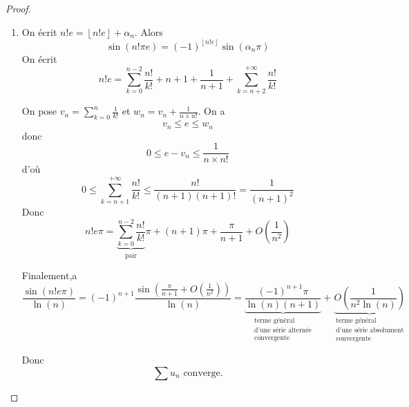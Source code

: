 \documentclass[12pt]{article}
\begin{document}
\begin{proof}
\begin{enumerate}
		\item On écrit $n!e=\left\lfloor n!e\right\rfloor+\alpha_{n}$.
		Alors 
		\begin{equation}\sin(n!\pi e)=(-1)^{\left\lfloor n!e\right\rfloor}\sin(\alpha_{n}\pi)\end{equation}
		On écrit 
		\begin{equation}n!e=\sum_{k=0}^{n-2}\frac{n!}{k!}+n+1+\frac{1}{n+1}+\sum_{k=n+2}^{+\infty}\frac{n!}{k!}\end{equation}

		On pose $v_{n}=\sum_{k=0}^{n}\frac{1}{k!}$ et $w_{n}=v_{n}+\frac{1}{n\times n!}$. On a 
		\begin{equation}v_{n}\leqslant e\leqslant w_{n}\end{equation}
		donc 
		\begin{equation}0\leqslant e-v_{n}\leqslant\frac{1}{n\times n!}\end{equation}
		d'où
		\begin{equation}0\leqslant \sum_{k=n+1}^{+\infty}\frac{n!}{k!}\leqslant\frac{n!}{(n+1)(n+1)!}=\frac{1}{(n+1)^{2}}\end{equation}
		Donc 
		\begin{equation}n!e\pi = \underbrace{\sum_{k=0}^{n-2}\frac{n!}{k!}}_{\text{pair}}\pi+(n+1)\pi+\frac{\pi}{n+1}+O\left(\frac{1}{n^{2}}\right)\end{equation}

		Finalement,a
		\begin{equation}\frac{\sin(n!e\pi)}{\ln(n)}=(-1)^{n+1}\frac{\sin\left(\frac{\pi}{n+1}+O\left(\frac{1}{n^{2}}\right)\right)}{\ln(n)}=\underbrace{\frac{(-1)^{n+1}\pi}{\ln(n)(n+1)}}_{\substack{\text{terme général}\\\text{d'une série alternée}\\\text{convergente}}}+\underbrace{O\left(\frac{1}{n^{2}\ln(n)}\right)}_{\substack{\text{terme général}\\\text{d'une série absolument}\\\text{convergente}}}\end{equation}

		Donc 
		\begin{equation}\boxed{\sum u_{n}\text{ converge.}}\end{equation}
	\end{enumerate}
\end{proof}
\end{document}
